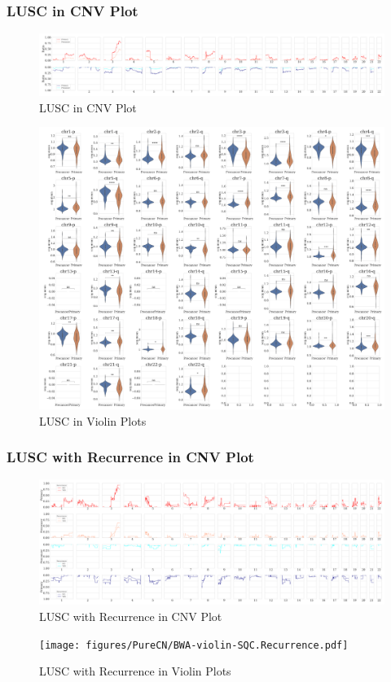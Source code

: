 \documentclass{beamer}
\begin{document}
    \begin{frame}[allowframebreaks]
        \frametitle{LUSC in CNV Plot}

        \begin{figure}
            \includegraphics[width=\linewidth]{figures/PureCN/BWA-simple-SQC.pdf}
            \caption{LUSC in CNV Plot}
        \end{figure}

        \begin{figure}
            \includegraphics[width=0.7 \linewidth]{figures/PureCN/BWA-violin-SQC.pdf}
            \caption{LUSC in Violin Plots}
        \end{figure}
    \end{frame}

    \begin{frame}[allowframebreaks]
        \frametitle{LUSC with Recurrence in CNV Plot}

        \begin{figure}
            \includegraphics[width=\linewidth]{figures/PureCN/BWA-simple-SQC.Recurrence.pdf}
            \caption{LUSC with Recurrence in CNV Plot}
        \end{figure}

        \begin{figure}
            \texttt{[image: figures/PureCN/BWA-violin-SQC.Recurrence.pdf]}
            \caption{LUSC with Recurrence in Violin Plots}
        \end{figure}
    \end{frame}
\end{document}
